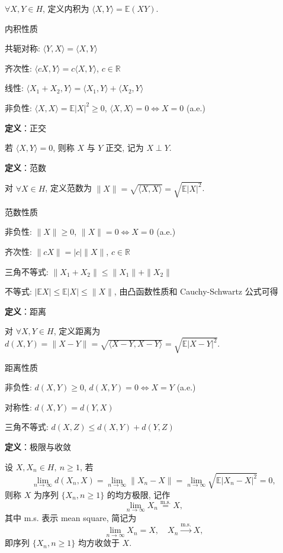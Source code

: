 \documentclass[openany]{ctexbook}
\theoremstyle{kaiti}
\theoremstyle{normal}
\begin{document}
$\forall X,Y\in H$, 定义内积为 $\langle X,Y\rangle=\mathbb{E}(XY)$.

内积性质

共轭对称: $\langle Y,X\rangle=\langle X,Y\rangle$

齐次性: $\langle cX,Y\rangle=c\langle X,Y\rangle$, $c\in\mathbb{R}$

线性: $\langle X_1+X_2,Y\rangle=\langle X_1,Y\rangle+\langle X_2,Y\rangle$

非负性: $\langle X,X\rangle=\mathbb{E}|X|^2\geqslant0$, $\langle X,X\rangle=0\Leftrightarrow X=0$ (a.e.)

\textbf{定义}：正交

若 $\langle X,Y\rangle=0$, 则称 $X$ 与 $Y$ 正交, 记为 $X\perp Y$.

\textbf{定义}：范数

对 $\forall X\in H$, 定义范数为 $\|X\|=\sqrt{\langle X,X\rangle}=\sqrt{\mathbb{E}|X|^2}$.

范数性质

非负性: $\|X\|\geqslant0$, $\|X\|=0\Leftrightarrow X=0$ (a.e.)

齐次性: $\|cX\|=|c|\|X\|$, $c\in\mathbb{R}$

三角不等式: $\|X_1+X_2\|\leqslant\|X_1\|+\|X_2\|$

不等式: $|\mathbb{E}X|\leqslant \mathbb{E}|X|\leqslant\|X\|$, 由凸函数性质和 Cauchy-Schwartz 公式可得

\textbf{定义}：距离

对 $\forall X,Y\in H$, 定义距离为 $d(X,Y)=\|X-Y\|=\sqrt{\langle X-Y,X-Y\rangle}=\sqrt{\mathbb{E}|X-Y|^2}$.

距离性质

非负性: $d(X,Y)\geqslant0$, $d(X,Y)=0\Leftrightarrow X=Y$ (a.e.)

对称性: $d(X,Y)=d(Y,X)$

三角不等式: $d(X,Z)\leqslant d(X,Y)+d(Y,Z)$

\textbf{定义}：极限与收敛

设 $X,X_n\in H,~n\geqslant1$, 若
\begin{equation}
  \lim_{n\to\infty}d(X_n,X)=\lim_{n\to\infty}\|X_n-X\|=\lim_{n\to\infty}\sqrt{\mathbb{E}|X_n-X|^2}=0,
\end{equation}
 则称 $X$ 为序列 $\{X_n,n\geqslant1\}$ 的均方极限, 记作
\begin{equation}
  \lim_{n\to\infty}X_n\overset{\mathrm{m.s.}}{=}X,
\end{equation}
 其中 m.s. 表示 mean square, 简记为
\begin{equation}
  \lim_{n\to\infty}X_n=X,\quad X_n\overset{\mathrm{m.s.}}{\rightarrow}X,
\end{equation}
 即序列 $\{X_n,n\geqslant1\}$ 均方收敛于 $X$.
\end{document}
